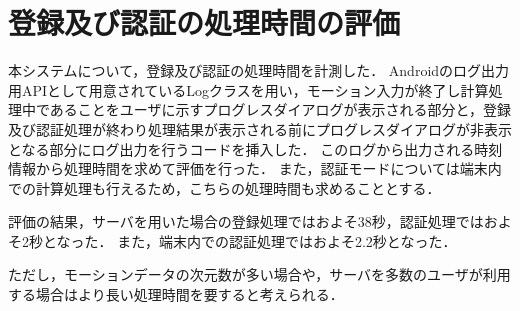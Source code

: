 \section{登録及び認証の処理時間の評価}
本システムについて，登録及び認証の処理時間を計測した．
Androidのログ出力用APIとして用意されているLogクラス\cite{5-log}を用い，モーション入力が終了し計算処理中であることをユーザに示すプログレスダイアログが表示される部分と，登録及び認証処理が終わり処理結果が表示される前にプログレスダイアログが非表示となる部分にログ出力を行うコードを挿入した．
このログから出力される時刻情報から処理時間を求めて評価を行った．
また，認証モードについては端末内での計算処理も行えるため，こちらの処理時間も求めることとする．

評価の結果，サーバを用いた場合の登録処理ではおよそ38秒，認証処理ではおよそ2秒となった．
また，端末内での認証処理ではおよそ2.2秒となった．

ただし，モーションデータの次元数が多い場合や，サーバを多数のユーザが利用する場合はより長い処理時間を要すると考えられる．
